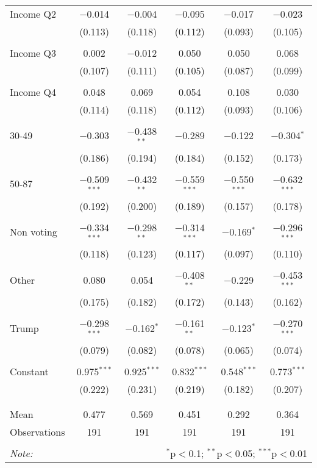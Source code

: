 \begin{tabular}{@{\extracolsep{5pt}}lccccc}
 Income Q2 & $-$0.014 & $-$0.004 & $-$0.095 & $-$0.017 & $-$0.023 \\ 
  & (0.113) & (0.118) & (0.112) & (0.093) & (0.105) \\ 
  & & & & & \\ 
 Income Q3 & 0.002 & $-$0.012 & 0.050 & 0.050 & 0.068 \\ 
  & (0.107) & (0.111) & (0.105) & (0.087) & (0.099) \\ 
  & & & & & \\ 
 Income Q4 & 0.048 & 0.069 & 0.054 & 0.108 & 0.030 \\ 
  & (0.114) & (0.118) & (0.112) & (0.093) & (0.106) \\ 
  & & & & & \\ 
 30-49 & $-$0.303 & $-$0.438$^{**}$ & $-$0.289 & $-$0.122 & $-$0.304$^{*}$ \\ 
  & (0.186) & (0.194) & (0.184) & (0.152) & (0.173) \\ 
  & & & & & \\ 
 50-87 & $-$0.509$^{***}$ & $-$0.432$^{**}$ & $-$0.559$^{***}$ & $-$0.550$^{***}$ & $-$0.632$^{***}$ \\ 
  & (0.192) & (0.200) & (0.189) & (0.157) & (0.178) \\ 
  & & & & & \\ 
 Non voting & $-$0.334$^{***}$ & $-$0.298$^{**}$ & $-$0.314$^{***}$ & $-$0.169$^{*}$ & $-$0.296$^{***}$ \\ 
  & (0.118) & (0.123) & (0.117) & (0.097) & (0.110) \\ 
  & & & & & \\ 
 Other & 0.080 & 0.054 & $-$0.408$^{**}$ & $-$0.229 & $-$0.453$^{***}$ \\ 
  & (0.175) & (0.182) & (0.172) & (0.143) & (0.162) \\ 
  & & & & & \\ 
 Trump & $-$0.298$^{***}$ & $-$0.162$^{*}$ & $-$0.161$^{**}$ & $-$0.123$^{*}$ & $-$0.270$^{***}$ \\ 
  & (0.079) & (0.082) & (0.078) & (0.065) & (0.074) \\ 
  & & & & & \\ 
 Constant & 0.975$^{***}$ & 0.925$^{***}$ & 0.832$^{***}$ & 0.548$^{***}$ & 0.773$^{***}$ \\ 
  & (0.222) & (0.231) & (0.219) & (0.182) & (0.207) \\ 
  & & & & & \\ 
\hline \\[-1.8ex] 
Mean & 0.477 & 0.569 & 0.451 & 0.292 & 0.364 \\ 
Observations & 191 & 191 & 191 & 191 & 191 \\ 
\hline 
\hline \\[-1.8ex] 
\textit{Note:}  & \multicolumn{5}{r}{$^{*}$p$<$0.1; $^{**}$p$<$0.05; $^{***}$p$<$0.01} \\ 
\end{tabular} 
